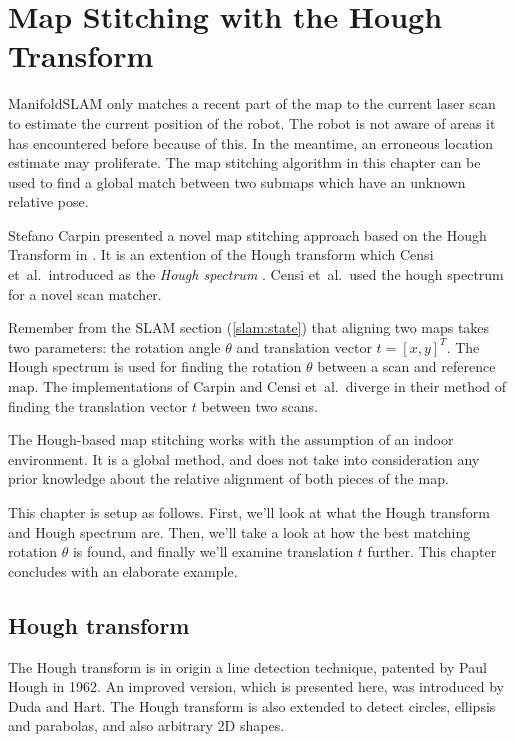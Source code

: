 
\chapter{Map Stitching with the Hough Transform}
\label{chapter:hough}
ManifoldSLAM only matches a recent part of the map to the current laser scan to estimate the current position of the robot. The robot is not aware of areas it has encountered before because of this. In the meantime, an erroneous location estimate may proliferate. The map stitching algorithm in this chapter can be used to find a global match between two submaps which have an unknown relative pose.

Stefano Carpin presented a novel map stitching approach based on the Hough Transform in \cite{carpin2008merging}. It is an extention of the Hough transform which Censi et~al.\ introduced as the \emph{Hough spectrum} \cite{censi2005scan}. Censi et~al.\ used the hough spectrum for a novel scan matcher. 

Remember from the SLAM section (\ref{slam:state}) that aligning two maps takes two parameters: the rotation angle $\theta$ and translation vector $t = [x, y]^T$. The Hough spectrum is used for finding the rotation $\theta$ between a scan and reference map. The implementations of Carpin and Censi et~al.\ diverge in their method of finding the translation vector $t$ between two scans. 

The Hough-based map stitching works with the assumption of an indoor environment. It is a global method, and does not take into consideration any prior knowledge about the relative alignment of both pieces of the map.

This chapter is setup as follows. First, we'll look at what the Hough transform and Hough spectrum are. Then, we'll take a look at how the best matching rotation $\hat\theta$ is found, and finally we'll examine translation $t$ further. This chapter concludes with an elaborate example.

\section{Hough transform}
The Hough transform is in origin a line detection technique, patented by Paul Hough in 1962\cite{hough1962method}. An improved version, which is presented here, was introduced by Duda and Hart\cite{duda1972use}. The Hough transform is also extended to detect circles, ellipsis and parabolas, and also arbitrary 2D shapes\cite{ballard1981generalizing}.

